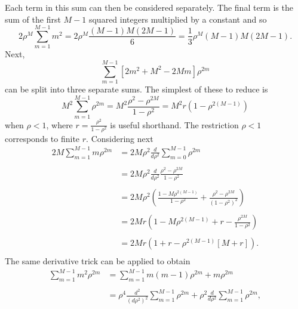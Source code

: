 \documentclass[letterpaper,12pt,oneside,final]{article}
\begin{document}
Each term in this sum can then be considered separately. The final term is the sum of the first $M-1$ squared integers multiplied by a constant and so
\begin{equation} \label{eq:multipleTesting:traceterm4}
  2 \rho^M \sum_{m = 1}^{M-1} m^2 = 2 \rho^M \frac{(M-1)M(2M-1)}{6} = \frac{1}{3}\rho^M (M-1)M(2M-1).
\end{equation}
Next,
$$\sum_{m = 1}^{M-1} \left [ 2m^2 + M^2 - 2Mm \right ] \rho^{2m}$$
can be split into three separate sums. The simplest of these to reduce is
\begin{equation} \label{eq:multipleTesting:traceterm3}
  M^2 \sum_{m = 1}^{M-1} \rho^{2m} = M^2 \frac{\rho^2 - \rho^{2M}}{1 - \rho^2} = M^2 r (1 - \rho^{2(M-1)})
\end{equation}
when $\rho < 1$, where $r = \frac{\rho^2}{1 - \rho^2}$ is useful shorthand. The restriction $\rho < 1$ corresponds to finite $r$. Considering next
\begin{equation} \label{eq:multipleTesting:traceterm2}
  \begin{aligned}
    2M \sum_{m = 1}^{M-1} m \rho^{2m} & = 2M \rho^2 \frac{d}{d\rho^2} \sum_{m = 0}^{M-1} \rho^{2m}\\
    & \\
    & = 2M \rho^2 \frac{d}{d\rho^2} \frac{\rho^2 - \rho^{2M}}{1 - \rho^2}\\
    & \\
    & = 2M \rho^2 \left ( \frac{1 - M\rho^{2(M-1)}}{1 - \rho^2} + \frac{\rho^2 - \rho^{2M}}{(1 - \rho^2)^2} \right ) \\
    & \\
    & = 2Mr\left (1 - M\rho^{2(M-1)} + r  - \frac{\rho^{2M}}{1 - \rho^2} \right ) \\
    & \\
    & = 2Mr\left (1 + r - \rho^{2(M-1)} [ M + r ] \right ). \\
  \end{aligned}
\end{equation}
The same derivative trick can be applied to obtain
\begin{equation} \label{eq:multipleTesting:traceterm4a}
  \begin{aligned}
    \sum_{m = 1}^{M-1} m^2 \rho^{2m} & = \sum_{m = 1}^{M-1} m (m-1) \rho^{2m} + m \rho^{2m} \\
    & \\
    & = \rho^4 \frac{d^2}{(d\rho^2)^2} \sum_{m = 1}^{M-1} \rho^{2m} + \rho^2 \frac{d}{d\rho^2} \sum_{m = 1}^{M-1} \rho^{2m}, \\
  \end{aligned}
\end{equation}
\end{document}
